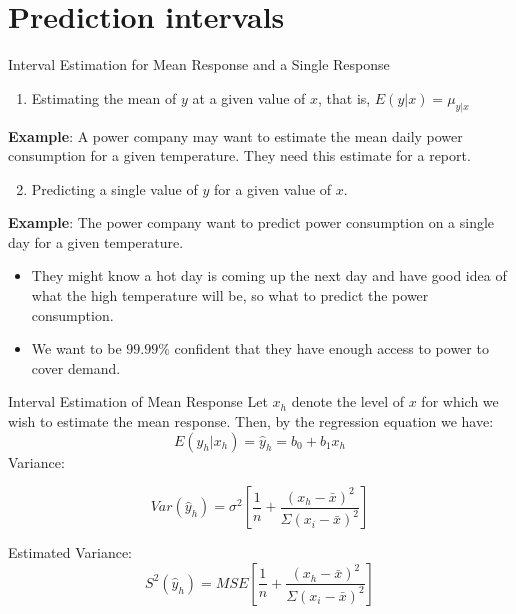 \documentclass[
  ignorenonframetext,
]{beamer}
\providecommand{\tightlist}{%
  \setlength{\itemsep}{0pt}\setlength{\parskip}{0pt}}
\begin{document}
\section{Prediction intervals}\label{prediction-intervals}

\begin{frame}{Interval Estimation for Mean Response and a Single
Response}
\label{interval-estimation-for-mean-response-and-a-single-response}
\begin{enumerate}
\tightlist
\item
  Estimating the mean of \(y\) at a given value of \(x\), that is,
  \(E(y|x)=\mu_{y|x}\)
\end{enumerate}

\textbf{Example}: A power company may want to estimate the mean daily
power consumption for a given temperature. They need this estimate for a
report.

\begin{enumerate}
\setcounter{enumi}{1}
\tightlist
\item
  Predicting a single value of \(y\) for a given value of \(x\).
\end{enumerate}

\textbf{Example}: The power company want to predict power consumption on
a single day for a given temperature.

\begin{itemize}
\item
  They might know a hot day is coming up the next day and have good idea
  of what the high temperature will be, so what to predict the power
  consumption.
\item
  We want to be \(99.99\%\) confident that they have enough access to
  power to cover demand.
\end{itemize}
\end{frame}

\begin{frame}{Interval Estimation of Mean Response}
\label{interval-estimation-of-mean-response}
Let \(x_h\) denote the level of \(x\) for which we wish to estimate the
mean response. Then, by the regression equation we have:
\[E(y_h|x_h)=\hat{y}_h=b_0+b_1x_h\] Variance:

\[Var(\hat{y}_h)=\sigma^2\left[\frac{1}{n}+\frac{(x_h-\bar{x})^2}{\Sigma(x_i-\bar{x})^2}\right]\]

Estimated Variance:
\[S^2(\hat{y}_h)=MSE\left[\frac{1}{n}+\frac{(x_h-\bar{x})^2}{\Sigma(x_i-\bar{x})^2}\right]\]
\end{frame}
\end{document}
